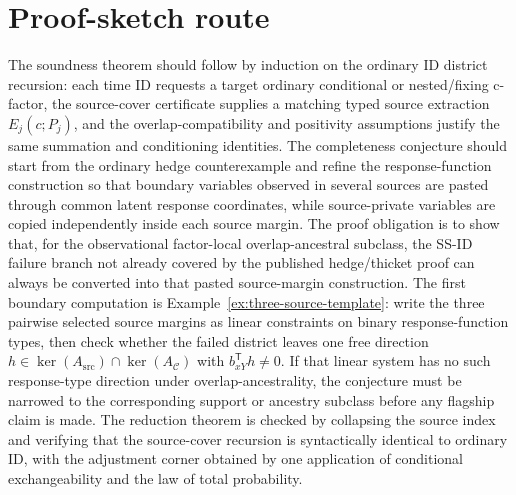 \documentclass[11pt]{article}
\newcommand{\transpose}{\mathsf{T}}
\theoremstyle{definition}
\theoremstyle{plain}
\theoremstyle{remark}
\begin{document}
\section{Proof-sketch route}
The soundness theorem should follow by induction on the ordinary ID district
recursion: each time ID requests a target ordinary conditional or nested/fixing
c-factor, the source-cover certificate supplies a matching typed source
extraction \(E_j(c;P_j)\), and the overlap-compatibility and positivity
assumptions justify the same summation and conditioning identities.
The completeness conjecture should start from the ordinary hedge
counterexample and refine the response-function construction so that boundary
variables observed in several sources are pasted through common latent
response coordinates, while source-private variables are copied independently
inside each source margin.  The proof obligation is to show that, for the
observational factor-local overlap-ancestral subclass, the SS-ID failure
branch not already covered by the published hedge/thicket proof can always be
converted into that pasted source-margin construction.  The first boundary
computation is
Example~\ref{ex:three-source-template}: write the three pairwise selected
source margins as linear constraints on binary response-function types, then
check whether the failed district leaves one free direction
\(h\in\ker(A_{\mathrm{src}})\cap\ker(A_{\mathcal C})\) with
\(b_{xY}^{\transpose}h\ne 0\).  If that linear system has
no such response-type direction under overlap-ancestrality, the conjecture must be narrowed
to the corresponding support or ancestry subclass before any flagship claim is
made.  The reduction theorem is checked by
collapsing the source index and verifying that the source-cover recursion is
syntactically identical to ordinary ID, with the adjustment corner obtained by
one application of conditional exchangeability and the law of total
probability.
\end{document}
